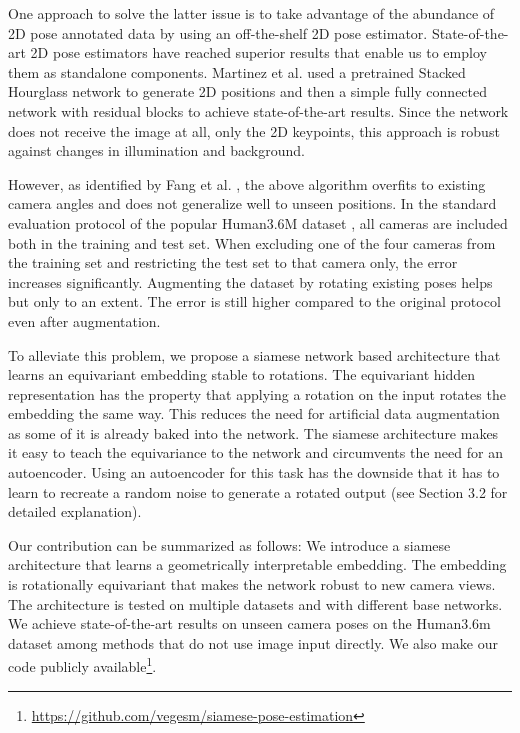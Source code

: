 \documentclass[preprint]{elsarticle}
\begin{document}
One approach to solve the latter issue is to take advantage of the abundance of 2D pose annotated data by using an off-the-shelf 2D pose estimator. State-of-the-art 2D pose estimators \cite{openpose,stacked_hourglass,alphapose} have reached superior results that enable us to employ them as standalone components. Martinez et al. \cite{3dbaseline} used a pretrained Stacked Hourglass network \cite{stacked_hourglass} to generate 2D positions and then a simple fully connected network with residual blocks to achieve state-of-the-art results. Since the network does not receive the image at all, only the 2D keypoints, this approach is robust against changes in illumination and background.

However, as identified by Fang et al. \cite{fang2018posegrammar}, the above algorithm overfits to existing camera angles and does not generalize well to unseen positions. In the standard evaluation protocol of the popular Human3.6M dataset \cite{h36m}, all cameras are included both in the training and test set. When excluding one of the four cameras from the training set and restricting the test set to that camera only, the error increases significantly. Augmenting the dataset by rotating existing poses helps but only to an extent. The error is still higher compared to the original protocol even after augmentation.

To alleviate this problem, we propose a siamese network \cite{siameseSignature} based architecture that learns an equivariant embedding stable to rotations. The equivariant hidden representation has the property that applying a rotation on the input rotates the embedding the same way. This reduces the need for artificial data augmentation as some of it is already baked into the network. The siamese architecture makes it easy to teach the equivariance to the network and circumvents the need for an autoencoder. Using an autoencoder for this task has the downside that it has to learn to recreate a random noise to generate a rotated output (see Section 3.2 for detailed explanation).

Our contribution can be summarized as follows: We introduce a siamese architecture that learns a geometrically interpretable embedding. The embedding is rotationally equivariant that makes the network robust to new camera views. The architecture is tested on multiple datasets and with different base networks. We achieve state-of-the-art results on unseen camera poses on the Human3.6m dataset \cite{h36m} among methods that do not use image input directly. We also make our code publicly available\footnote{\url{https://github.com/vegesm/siamese-pose-estimation}}.
\end{document}
